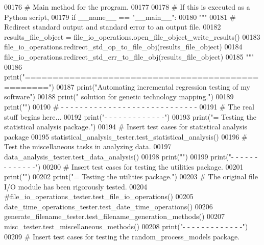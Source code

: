 \begin{DoxyCode}
00176 \textcolor{comment}{# Main method for the program.}
00177 
00178 \textcolor{comment}{#   If this is executed as a Python script,}
00179 \textcolor{keywordflow}{if} \_\_name\_\_ == \textcolor{stringliteral}{"\_\_main\_\_"}:
00180     \textcolor{stringliteral}{"""}
00181 \textcolor{stringliteral}{    # Redirect standard output and standard error to an output file.}
00182 \textcolor{stringliteral}{    results\_file\_object = file\_io\_operations.open\_file\_object\_write\_results()}
00183 \textcolor{stringliteral}{    file\_io\_operations.redirect\_std\_op\_to\_file\_obj(results\_file\_object)}
00184 \textcolor{stringliteral}{    file\_io\_operations.redirect\_std\_err\_to\_file\_obj(results\_file\_object)}
00185 \textcolor{stringliteral}{    """}
00186     print(\textcolor{stringliteral}{"=================================================="})
00187     print(\textcolor{stringliteral}{"Automating incremental regression testing of my software"})
00188     print(\textcolor{stringliteral}{" solution for genetic technology mapping."})
00189     print(\textcolor{stringliteral}{""})
00190     \textcolor{comment}{# - - - - - - - - - - - - - - - - - - - - - - - - - - - - -}
00191     \textcolor{comment}{# The real stuff begins here...}
00192     print(\textcolor{stringliteral}{"-    -   -   -   -   -   -   -   -   -   -   -   -"})
00193     print(\textcolor{stringliteral}{"=    Testing the statistical analysis package."})
00194     \textcolor{comment}{#   Insert test cases for statistical analysis package}
00195     statistical\_analysis\_tester.test\_statistical\_analysis()
00196     \textcolor{comment}{# Test the miscellaneous tasks in analyzing data.}
00197     data\_analysis\_tester.test\_data\_analysis()
00198     print(\textcolor{stringliteral}{""})
00199     print(\textcolor{stringliteral}{"-    -   -   -   -   -   -   -   -   -   -   -   -"})
00200     \textcolor{comment}{# Insert test cases for testing the utilities package.}
00201     print(\textcolor{stringliteral}{""})
00202     print(\textcolor{stringliteral}{"=    Testing the utilities package."})
00203     \textcolor{comment}{#   The original file I/O module has been rigorously tested.}
00204     \textcolor{comment}{#file\_io\_operations\_tester.test\_file\_io\_operations()}
00205     date\_time\_operations\_tester.test\_date\_time\_operations()
00206     generate\_filename\_tester.test\_filename\_generation\_methods()
00207     misc\_tester.test\_miscellaneous\_methods()
00208     print(\textcolor{stringliteral}{"-    -   -   -   -   -   -   -   -   -   -   -   -"})
00209     \textcolor{comment}{# Insert test cases for testing the random\_process\_models package.}

\end{DoxyCode}
